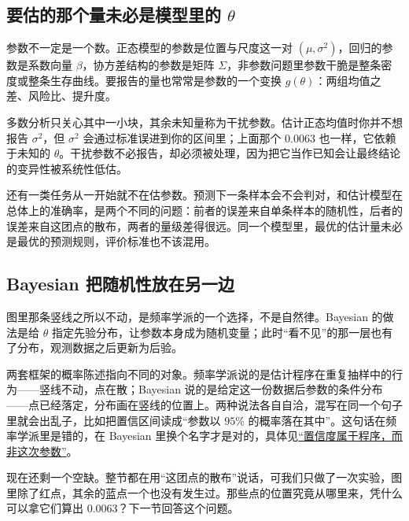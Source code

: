 \subsection{要估的那个量未必是模型里的 \(\theta\)}

参数不一定是一个数。正态模型的参数是位置与尺度这一对 \((\mu,\sigma^2)\)，回归的参数是系数向量 \(\beta\)，协方差结构的参数是矩阵 \(\Sigma\)，非参数问题里参数干脆是整条密度或整条生存曲线。要报告的量也常常是参数的一个变换 \(g(\theta)\)：两组均值之差、风险比、提升度。

多数分析只关心其中一小块，其余未知量称为干扰参数。估计正态均值时你并不想报告 \(\sigma^2\)，但 \(\sigma^2\) 会通过标准误进到你的区间里；上面那个 \(0.0063\) 也一样，它依赖于未知的 \(\theta\)。干扰参数不必报告，却必须被处理，因为把它当作已知会让最终结论的变异性被系统性低估。

还有一类任务从一开始就不在估参数。预测下一条样本会不会判对，和估计模型在总体上的准确率，是两个不同的问题：前者的误差来自单条样本的随机性，后者的误差来自这团点的散布，两者的量级差得很远。同一个模型里，最优的估计量未必是最优的预测规则，评价标准也不该混用。

\subsection{Bayesian 把随机性放在另一边}

图里那条竖线之所以不动，是频率学派的一个选择，不是自然律。Bayesian 的做法是给 \(\theta\) 指定先验分布，让参数本身成为随机变量；此时``看不见''的那一层也有了分布，观测数据之后更新为后验。

两套框架的概率陈述指向不同的对象。频率学派说的是估计程序在重复抽样中的行为——竖线不动，点在散；Bayesian 说的是给定这一份数据后参数的条件分布——点已经落定，分布画在竖线的位置上。两种说法各自自洽，混写在同一个句子里就会出乱子，比如把置信区间读成``参数以 \(95\%\) 的概率落在其中''。这句话在频率学派里是错的，在 Bayesian 里换个名字才是对的，具体见\hyperref[sec:11-Mathematical-Statistics/04-Interval-Estimation/01]{``置信度属于程序，而非这次参数''}。

现在还剩一个空缺。整节都在用``这团点的散布''说话，可我们只做了一次实验，图里除了红点，其余的蓝点一个也没有发生过。那些点的位置究竟从哪里来，凭什么可以拿它们算出 \(0.0063\)？下一节回答这个问题。
